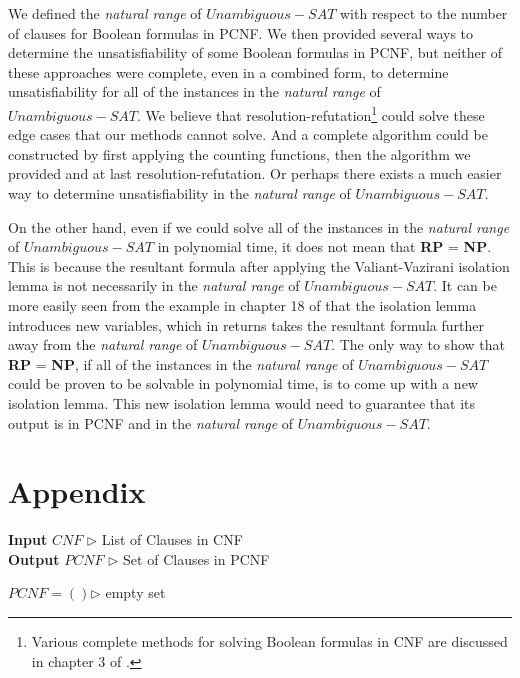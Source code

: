 \documentclass[runningheads,a4paper]{llncs}
\let\oldsim\sim
\renewcommand{\sim}{{\oldsim}}
\begin{document}
We defined the \emph{natural range} of ${Unambiguous-SAT}$ with respect to the number of clauses for Boolean formulas in PCNF. We then provided several ways to determine the unsatisfiability of some Boolean formulas in PCNF, but neither of these approaches were complete, even in a combined form, to determine unsatisfiability for all of the instances in the \emph{natural range} of ${Unambiguous-SAT}$. We believe that resolution-refutation\footnote{Various complete methods for solving Boolean formulas in CNF are discussed in chapter 3 of  \cite{AMH09}.} could solve these edge cases that our methods cannot solve. And a complete algorithm could be constructed by first applying the counting functions, then the algorithm we provided and at last resolution-refutation. Or perhaps there exists a much easier way to determine unsatisfiability in the \emph{natural range} of ${Unambiguous-SAT}$.

On the other hand, even if we could solve all of the instances in the \emph{natural range} of ${Unambiguous-SAT}$ in polynomial time, it does not mean that {\bf RP} = {\bf NP}. This is because the resultant formula after applying the Valiant-Vazirani isolation lemma is not necessarily in the  \emph{natural range} of ${Unambiguous-SAT}$. It can be more easily seen from the example in chapter 18 of \cite{P94} that the isolation lemma introduces new variables, which in returns takes the resultant formula further away from the \emph{natural range} of ${Unambiguous-SAT}$. The only way to show that {\bf RP} = {\bf NP}, if all of the instances in the \emph{natural range} of ${Unambiguous-SAT}$ could be proven to be solvable in polynomial time, is to come up with a new isolation lemma. This new isolation lemma would need to guarantee that its output is in PCNF and in the \emph{natural range} of ${Unambiguous-SAT}$. 


\section{Appendix}
\begin{algorithm}[H]
\caption{An algorithm that turns a CNF to PCNF}
 \hspace*{\algorithmicindent} \textbf{Input} $CNF$ {$\triangleright$ List of Clauses in CNF} \\
 \hspace*{\algorithmicindent} \textbf{Output} $PCNF$ {$\triangleright$ Set of Clauses in PCNF}
\begin{algorithmic}
\State $PCNF=()${$\triangleright$ empty set }
          \State{$temp\_c.add(re.sub('\sim','',l))$}
      \EndFor
      \EndIf
\EndFor
\end{algorithmic}
\end{algorithm}
\end{document}
